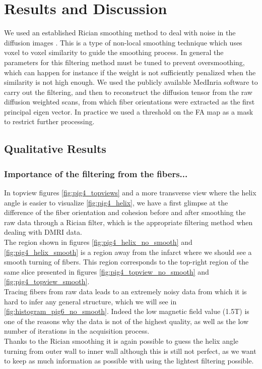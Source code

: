 \chapter{Results and Discussion}

We used an established Rician smoothing method to deal with noise in the diffusion images \cite{wiest2008rician}. This is a type of non-local smoothing technique which uses voxel to voxel similarity to guide the smoothing process. In general the parameters for this filtering method must be tuned to prevent oversmoothing, which can happen for instance if the weight is not sufficiently penalized when the similarity is not high enough. We used the publicly available MedInria software to carry out the filtering, and then to reconstruct the diffusion tensor from the raw diffusion weighted scans, from which fiber orientations were extracted as the first principal eigen vector. In practice we used a threshold on the FA map as a mask to restrict further processing.

\section{Qualitative Results}

\subsection{Importance of the filtering from the fibers...}

In topview figures \ref{fig:pig4_topviews} and a more transverse view where the helix angle is easier to visualize \ref{fig:pig4_helix}, we have a first glimpse at the difference of the fiber orientation and cohesion before and after smoothing the raw data through a Rician filter, which is the appropriate filtering method when dealing with DMRI data.\\
The region shown in figures \ref{fig:pig4_helix_no_smooth} and \ref{fig:pig4_helix_smooth} is a region away from the infarct where we should see a smooth turning of fibers. This region corresponds to the top-right region of the same slice presented in figures \ref{fig:pig4_topview_no_smooth} and \ref{fig:pig4_topview_smooth}.\\
Tracing fibers from raw data leads to an extremely noisy data from which it is hard to infer any general structure, which we will see in \ref{fig:histogram_pig6_no_smooth}. Indeed the low magnetic field value (1.5T) is one of the reasons why the data is not of the highest quality, as well as the low number of iterations in the acquisition process.\\
Thanks to the Rician smoothing it is again possible to guess the helix angle turning from outer wall to inner wall although this is still not perfect, as we want to keep as much information as possible with using the lightest filtering possible.

